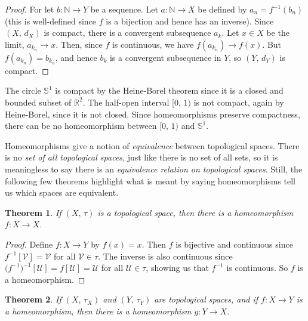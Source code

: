 \documentclass{article}
\theoremstyle{plain}
\newtheorem{theorem}{Theorem}[section]
\theoremstyle{normal}
\begin{document}
        \begin{proof}
            For let $b:\mathbb{N}\rightarrow{Y}$ be a sequence. Let
            $a:\mathbb{N}\rightarrow{X}$ be defined by
            $a_{n}=f^{-1}(b_{n})$ (this is well-defined since $f$ is a bijection
            and hence has an inverse). Since $(X,\,d_{X})$ is compact, there
            is a convergent subsequence $a_{k}$. Let $x\in{X}$ be the limit,
            $a_{k_{n}}\rightarrow{x}$. Then, since $f$ is continuous, we have
            $f(a_{k_{n}})\rightarrow{f}(x)$. But $f(a_{k_{n}})=b_{k_{n}}$,
            and hence $b_{k}$ is a convergent subsequence in $Y$, so
            $(Y,\,d_{Y})$ is compact.
        \end{proof}
        The circle $\mathbb{S}^{1}$ is compact by the Heine-Borel theorem since
        it is a closed and bounded subset of $\mathbb{R}^{2}$. The half-open
        interval $[0,\,1)$ is not compact, again by Heine-Borel, since it is
        not closed. Since homeomorphisms preserve compactness, there can be
        no homeomorphism between $[0,\,1)$ and $\mathbb{S}^{1}$.
        \par\hfill\par
        Homeomorphisms give a notion of \textit{equivalence} between topological
        spaces. There is no \textit{set of all topological spaces}, just like
        there is no set of all sets, so it is meaningless to say there is an
        \textit{equivalence relation on topological spaces}. Still, the
        following few theorems highlight what is meant by saying homeomorphisms
        tell us which spaces are equivalent.
        \begin{theorem}
            If $(X,\,\tau)$ is a topological space, then there is a
            homeomorphism $f:X\rightarrow{X}$.
        \end{theorem}
        \begin{proof}
            Define $f:X\rightarrow{Y}$ by $f(x)=x$. Then $f$ is bijective and
            continuous since $f^{-1}[\mathcal{V}]=\mathcal{V}$ for all
            $\mathcal{V}\in\tau$. The inverse is also continuous since
            $\big(f^{-1}\big)^{-1}[\mathcal{U}]=f[\mathcal{U}]=\mathcal{U}$ for
            all $\mathcal{U}\in\tau$, showing us that $f^{-1}$ is continuous.
            So $f$ is a homeomorphism.
        \end{proof}
        \begin{theorem}
            If $(X,\,\tau_{X})$ and $(Y,\,\tau_{Y})$ are topological spaces,
            and if $f:X\rightarrow{Y}$ is a homeomorphism, then there is a
            homeomorphism $g:Y\rightarrow{X}$.
        \end{theorem}
\end{document}

